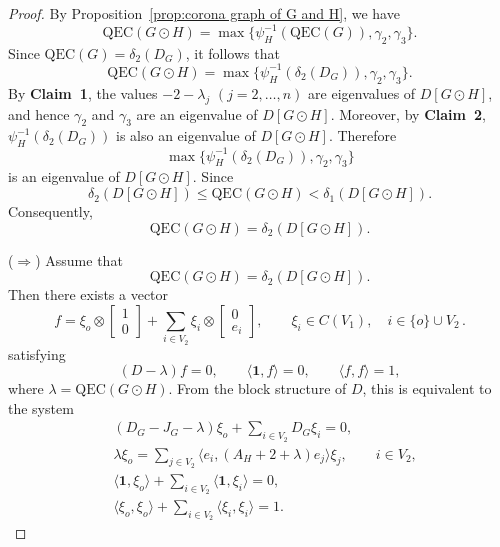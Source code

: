 \documentclass[10pt,a4paper]{amsart}
\begin{document}
\begin{proof}
By Proposition~\ref{prop:corona graph of G and H}, we have
\[
\mathrm{QEC}(G\odot H)
=
\max\{\psi_H^{-1}(\mathrm{QEC}(G)),\gamma_2,\gamma_3\}.
\]
Since $\mathrm{QEC}(G)=\delta_2(D_G)$, it follows that
\[
\mathrm{QEC}(G\odot H)
=
\max\{\psi_H^{-1}(\delta_2(D_G)),\gamma_2,\gamma_3\}.
\]
By \textbf{Claim~1}, the values $-2-\lambda_j$ $(j=2,\dots,n)$ are eigenvalues of $D[G\odot H]$, and hence $\gamma_2$ and $\gamma_3$ are an eigenvalue of $D[G\odot H]$. 
Moreover, by \textbf{Claim~2}, $\psi_H^{-1}(\delta_2(D_G))$ is also an eigenvalue of $D[G\odot H]$. 
Therefore
\[
\max\{\psi_H^{-1}(\delta_2(D_G)),\gamma_2,\gamma_3\}
\]
is an eigenvalue of $D[G\odot H]$. Since 
\[
\delta_2(D[G\odot H])
\le
\mathrm{QEC}(G\odot H)
<
\delta_1(D[G\odot H]).
\]
Consequently,
\[
\mathrm{QEC}(G\odot H)=\delta_2(D[G\odot H]).
\]

\medskip
\noindent
($\Rightarrow$)
Assume that
\[
\mathrm{QEC}(G\odot H)=\delta_2(D[G\odot H]).
\]
Then there exists a vector
\[f=\xi_o\otimes \begin{bmatrix} 1 \\ 0 \end{bmatrix}
+ \sum_{i\in V_2} \xi_i\otimes \begin{bmatrix} 0 \\ e_i \end{bmatrix},
\qquad
\xi_i \in C(V_1),
\quad i\in \{o\}\cup V_2\,.\] satisfying
\[
(D-\lambda)f=0, \qquad 
\langle \mathbf1,f\rangle=0, \qquad 
\langle f,f\rangle=1,
\]
where $\lambda=\mathrm{QEC}(G\odot H)$.
From the block structure of $D$, this is equivalent to the
system
\begin{align}
&(D_G-J_G-\lambda)\xi_o 
+\sum_{i\in V_2}D_G\xi_i=0,
\label{05eqn:basic equation (11)}
\\
&\lambda\xi_o
=\sum_{j\in V_2} \langle e_i, (A_H+2+\lambda)e_j\rangle \xi_j,
\qquad i\in V_2,
\label{05eqn:basic equation (12)}
\\
&\langle \mathbf{1}, \xi_o\rangle
+\sum_{i\in V_2} \langle \mathbf{1}, \xi_i\rangle=0,
\label{05eqn:basic equation (13)}
\\
&\langle \xi_o, \xi_o\rangle
+\sum_{i\in V_2} \langle \xi_i, \xi_i\rangle=1.
\label{05eqn:basic equation (14)}
\end{align}


\end{proof}
\end{document}
